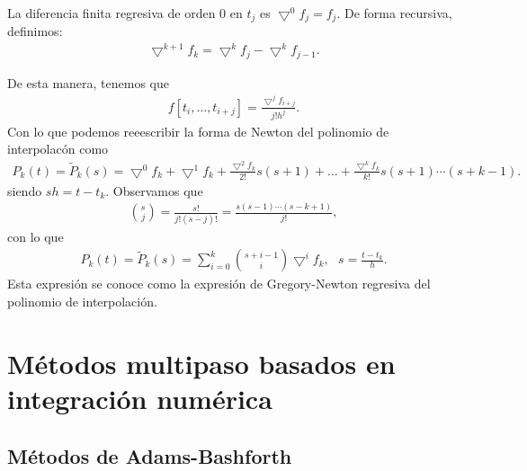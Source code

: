 \begin{defi}
La diferencia finita regresiva de orden 0 en $t_j$ es $\bigtriangledown^0f_j = f_j$. De forma recursiva, definimos:
\begin{align*}
    \bigtriangledown^{k+1}f_k = \bigtriangledown^k f_j - \bigtriangledown^kf_{j-1}.
\end{align*}
\end{defi}

\begin{obs}
De esta manera, tenemos que
\begin{align*}
    f[t_i,\ldots,t_{i+j}] = \frac{\bigtriangledown^j f_{i+j}}{j! h^j}.
\end{align*}
Con lo que podemos reeescribir la forma de Newton del polinomio de interpolacón como
\begin{align*}
    P_k(t) = \widetilde{P}_k(s) = \bigtriangledown^0 f_k + \bigtriangledown^1 f_k + \frac{\bigtriangledown^2 f_k}{2!}s(s+1) + \ldots + \frac{\bigtriangledown^k f_k}{k!}s(s+1)\cdots (s+k-1).
\end{align*}
siendo $sh = t - t_k$. Observamos que 
\begin{align*}
    \binom{s}{j} = \frac{s!}{j!(s-j)!} = \frac{s(s-1) \cdots (s-k+1)}{j!},
\end{align*}
con lo que
\begin{align*}
\boxed{
    P_k(t) = \widetilde{P}_k(s) = \sum_{i=0}^{k} \binom{s+i-1}{i} \bigtriangledown^i f_k, \ \ \ s = \frac{t - t_k}{h}.
}
\end{align*}
Esta expresión se conoce como la expresión de Gregory-Newton regresiva del polinomio de interpolación.
\end{obs}

\section{Métodos multipaso basados en integración numérica}

\subsection{Métodos de Adams-Bashforth}

